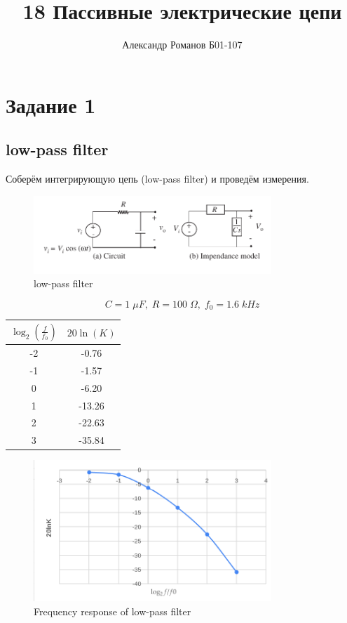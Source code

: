 \documentclass{article}
\author{Александр Романов Б01-107}
\date{}
\title{18 Пассивные электрические цепи}
\begin{document}
\maketitle


\section{Задание 1}
\subsection{low-pass filter}
Соберём интегрирующую цепь (low-pass filter) и проведём измерения.

\begin{figure}[H]
    \centering
    \includegraphics[width=0.8\textwidth]{low-pass-filter.png}
    \caption{low-pass filter}
\end{figure}

\[C = 1\;\mu F,\; R = 100\;\Omega,\; f_0 = 1.6\;kHz\]
\begin{table}[H]
    \centering
    \begin{tabular}{|c|c|}
        \hline
    \(\log_2\left(\frac{f}{f_0}\right)\)&\(20\ln(K)\)\\\hline
    -2 & -0.76  \\\hline
    -1 & -1.57  \\\hline
    0  & -6.20  \\\hline
    1  & -13.26 \\\hline
    2  & -22.63 \\\hline
    3  & -35.84 \\\hline
    \end{tabular}
\end{table}

\begin{figure}[H]
    \centering
    \includegraphics[width=0.8\textwidth]{18.1.png}
    \caption{Frequency response of low-pass filter }
\end{figure}
\end{document}
